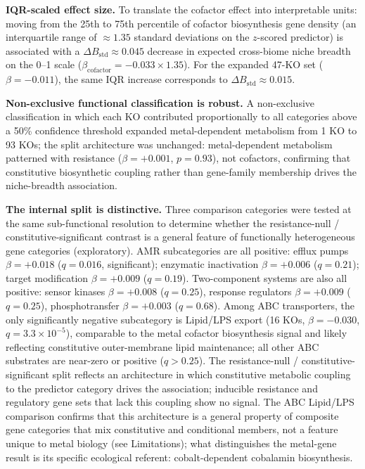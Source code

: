 \documentclass[times]{zHenriquesLab-StyleBioRxiv}
\begin{document}
\textbf{IQR-scaled effect size.} To translate the cofactor effect into
interpretable units: moving from the 25th to 75th percentile of cofactor
biosynthesis gene density (an interquartile range of $\approx 1.35$ standard
deviations on the $z$-scored predictor) is associated with a
$\Delta B_\mathrm{std} \approx 0.045$ decrease in expected cross-biome niche
breadth on the 0--1 scale ($\beta_\mathrm{cofactor} = -0.033 \times 1.35$).
For the expanded 47-KO set ($\beta = -0.011$), the same IQR increase corresponds
to $\Delta B_\mathrm{std} \approx 0.015$.



\textbf{Non-exclusive functional classification is robust.} A non-exclusive
classification in which each KO contributed proportionally to all categories
above a 50\% confidence threshold expanded metal-dependent metabolism from
1 KO to 93 KOs; the split architecture was unchanged: metal-dependent
metabolism patterned with resistance ($\beta = +0.001$, $p = 0.93$), not
cofactors, confirming that constitutive biosynthetic coupling rather than
gene-family membership drives the niche-breadth association.

\textbf{The internal split is distinctive.} Three comparison categories were
tested at the same sub-functional resolution to determine whether the
resistance-null / constitutive-significant contrast is a general feature of
functionally heterogeneous gene categories (exploratory). AMR
subcategories are all positive: efflux pumps $\beta = +0.018$ ($q = 0.016$,
significant); enzymatic inactivation $\beta = +0.006$ ($q = 0.21$); target
modification $\beta = +0.009$ ($q = 0.19$). Two-component systems are also all
positive: sensor kinases $\beta = +0.008$ ($q = 0.25$), response regulators
$\beta = +0.009$ ($q = 0.25$), phosphotransfer $\beta = +0.003$ ($q = 0.68$).
Among ABC transporters, the only significantly negative subcategory is Lipid/LPS
export (16 KOs, $\beta = -0.030$, $q = 3.3 \times 10^{-5}$), comparable to
the metal cofactor biosynthesis signal and likely reflecting constitutive
outer-membrane lipid maintenance; all other ABC
substrates are near-zero or positive ($q > 0.25$). The resistance-null /
constitutive-significant split reflects an architecture in which constitutive
metabolic coupling to the predictor category drives the association; inducible
resistance and regulatory gene sets that lack this coupling show no signal.
The ABC Lipid/LPS comparison confirms that this architecture is a general
property of composite gene categories that mix constitutive and conditional
members, not a feature unique to metal biology (see Limitations); what
distinguishes the metal-gene result is its specific ecological referent:
cobalt-dependent cobalamin biosynthesis.
\end{document}
